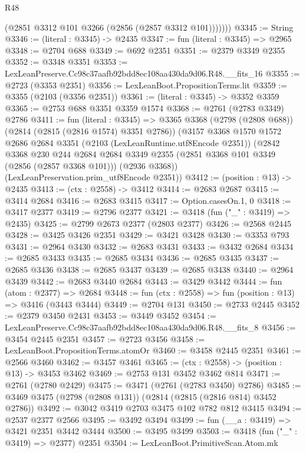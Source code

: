 \begin{lexlean}{R48}
\begin{coremodule}
            (@2851 @3312 @101 @3266 (@2856 (@2857 @3312 @101)))))))
@3345 := String
@3346 := (literal : @3345) -> @2435
@3347 := fun (literal : @3345) => @2965
@3348 := @2704 @688
@3349 := @692 @2351
@3351 := @2379 @3349 @2355
@3352 := @3348 @3351
@3353 := LexLeanPreserve.Cc98c37aafb92bdd8ec108aa430da9d06.R48.__fits_16
@3355 := @2723 (@3353 @2351)
@3356 := LexLeanBoot.PropositionTerms.lit
@3359 := @3355 (@2103 (@3356 @2351))
@3361 := (literal : @3345) -> @3352 @3359
@3365 := @2753 @688 @3351 @3359 @1574
@3368 := @2761 (@2783 @3349) @2786
@3411 := fun (literal : @3345) =>
  @3365
    @3368
    (@2798 (@2808 @688))
    (@2814 (@2815 (@2816 @1574) @3351 @2786))
    (@3157
      @3368
      @1570
      @1572
      @2686
      @2684
      @3351
      (@2103 (LexLeanRuntime.utf8Encode @2351))
      (@2842
        @3368
        @230
        @244
        @2684
        @2684
        @3349
        @2355
        (@2851 @3368 @101 @3349 (@2856 (@2857 @3368 @101)))
        (@2936 @3368))
      (LexLeanPreservation.prim_utf8Encode @2351))
@3412 := (position : @13) -> @2435
@3413 := (ctx : @2558) -> @3412
@3414 := @2683 @2687
@3415 := @3414 @2684
@3416 := @2683 @3415
@3417 := Option.casesOn.{1, 0}
@3418 := @3417 @2377
@3419 := @2796 @2377
@3421 := @3418 (fun ("_" : @3419) => @2435)
@3425 := @2799 @2673 @2377 (@2803 @2377)
@3426 := @2568 @2445
@3428 := @3425 @3426 @2351
@3429 := @3421 @3428
@3430 := @3353 @793
@3431 := @2964 @3430
@3432 := @2683 @3431
@3433 := @3432 @2684
@3434 := @2685 @3433
@3435 := @2685 @3434
@3436 := @2685 @3435
@3437 := @2685 @3436
@3438 := @2685 @3437
@3439 := @2685 @3438
@3440 := @2964 @3439
@3442 := @2683 @3440 @2684
@3443 := @3429 @3442
@3444 := fun (atom : @2377) => @2684
@3448 := fun (ctx : @2558) => fun (position : @13) => @3416 (@3443 @3444)
@3449 := @2704 @131
@3450 := @2733 @2445
@3452 := @2379 @3450 @2431
@3453 := @3449 @3452
@3454 := LexLeanPreserve.Cc98c37aafb92bdd8ec108aa430da9d06.R48.__fits_8
@3456 := @3454 @2445 @2351
@3457 := @2723 @3456
@3458 := LexLeanBoot.PropositionTerms.atomOr
@3460 := @3458 @2445 @2351
@3461 := @2566 @3460
@3462 := @3457 @3461
@3465 := (ctx : @2558) -> (position : @13) -> @3453 @3462
@3469 := @2753 @131 @3452 @3462 @814
@3471 := @2761 (@2780 @2429)
@3475 := @3471 (@2761 (@2783 @3450) @2786)
@3485 := @3469 @3475 (@2798 (@2808 @131)) (@2814 (@2815 (@2816 @814) @3452 @2786))
@3492 := @3042 @3419 @2703 @3475 @102 @782 @812 @3415
@3494 := @2537 @2377 @2566
@3495 := @3492 @3494
@3499 := fun (__a : @3419) => @3421 @2351 @3442 @3444
@3500 := @3495 @3499
@3503 := @3418 (fun ("_" : @3419) => @2377) @2351
@3504 := LexLeanBoot.PrimitiveScan.Atom.mk

\end{coremodule}
\end{lexlean}
